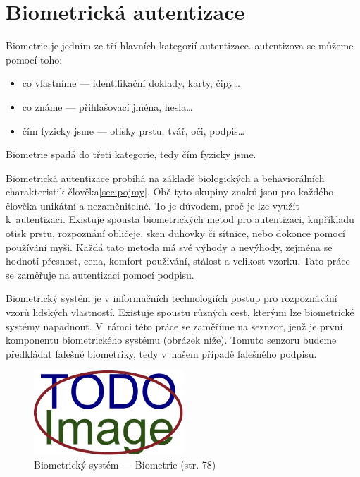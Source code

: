 \section{Biometrická autentizace}
Biometrie je jedním ze tří hlavních kategorií autentizace.
autentizova se můžeme pomocí toho:

\begin{itemize}
  \item co vlastníme --- identifikační doklady, karty, čipy\ldots   %
  \item co známe --- přihlašovací jména, hesla\ldots                %
  \item čím fyzicky jsme --- otisky prstu, tvář, oči, podpis\ldots  %
\end{itemize}                                                   %
Biometrie spadá do třetí kategorie, tedy čím fyzicky jsme. 

Biometrická autentizace probíhá na základě biologických a behaviorálních charakteristik člověka\ref{sec:pojmy}. 
Obě tyto skupiny znaků jsou pro každého člověka unikátní a nezaměnitelné. To je důvodem, proč je lze využít k~autentizaci.
Existuje spousta biometrických metod pro autentizaci, kupříkladu otisk prstu, rozpoznání obličeje, sken duhovky či sítnice, nebo dokonce pomocí používání myši. 
Každá tato metoda má své výhody a nevýhody, zejména se hodnotí přesnost, cena, komfort používání, stálost a velikost vzorku. %
Tato práce se zaměřuje na autentizaci pomocí podpisu.

Biometrický systém je v informačních technologiích postup pro rozpoznávání vzorů lidských vlastností.       %
Existuje spoustu různých cest, kterými lze biometrické systémy napadnout.                                   %
V~rámci této práce se zaměříme na seznzor, jenž je první komponentu biometrického systému (obrázek níže).   %
Tomuto senzoru budeme předkládat falešné biometriky, tedy v~našem případě falešného podpisu.                %

\begin{figure}[h]\label{fig:my-pdf}
  \centering
  \includegraphics[width=0.5\textwidth]{obrazky-figures/placeholder.pdf}
  \caption{Biometrický systém --- Biometrie (str. 78)}
\end{figure}

